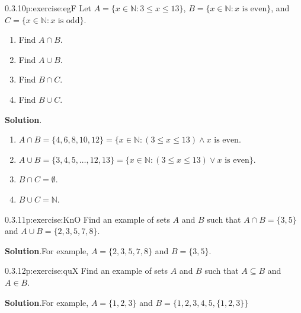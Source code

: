 \documentclass[twoside,11pt,]{book}
\newcommand{\blocktitlefont}{\relax}
\numberwithin{equation}{chapter}
\newcommand{\N}{\mathbb N}
\newcommand{\st}{:}
\begin{document}
\begin{divisionsolution}{0.3.10}{}{p:exercise:egF}%
Let \(A = \{x \in \N \st 3 \le x \le 13\}\), \(B = \{x \in \N \st x \mbox{ is even} \}\), and \(C = \{x \in \N \st x \mbox{ is odd} \}\).%
\begin{enumerate}[label=(\alph*)]
\item{}Find \(A \cap B\).%
\item{}Find \(A \cup B\).%
\item{}Find \(B \cap C\).%
\item{}Find \(B \cup C\).%
\end{enumerate}
%
\par\smallskip%
\noindent\textbf{\blocktitlefont Solution}.\quad{}%
\begin{enumerate}[label=(\alph*)]
\item{}\(A \cap B = \{4,6,8,10,12\} = \{x \in \N \st (3 \le x \le 13) \wedge x \mbox{ is even}\).%
\item{}\(A \cup B = \{3, 4, 5, \ldots, 12, 13\} = \{x \in \N \st (3 \le x \le 13) \vee x \mbox{ is even} \}\).%
\item{}\(B \cap C = \emptyset\).%
\item{}\(B \cup C = \N\).%
\end{enumerate}
%
\end{divisionsolution}%
\begin{divisionsolution}{0.3.11}{}{p:exercise:KnO}%
Find an example of sets \(A\) and \(B\) such that \(A\cap B = \{3, 5\}\) and \(A \cup B = \{2, 3, 5, 7, 8\}\).%
\par\smallskip%
\noindent\textbf{\blocktitlefont Solution}.\quad{}For example, \(A = \{2,3,5,7,8\}\) and \(B = \{3,5\}\).%
\end{divisionsolution}%
\begin{divisionsolution}{0.3.12}{}{p:exercise:quX}%
Find an example of sets \(A\) and \(B\) such that \(A \subseteq B\) and \(A \in B\).%
\par\smallskip%
\noindent\textbf{\blocktitlefont Solution}.\quad{}For example, \(A = \{1,2,3\}\) and \(B = \{1,2,3,4,5,\{1,2,3\}\}\)%
\end{divisionsolution}%
\end{document}
